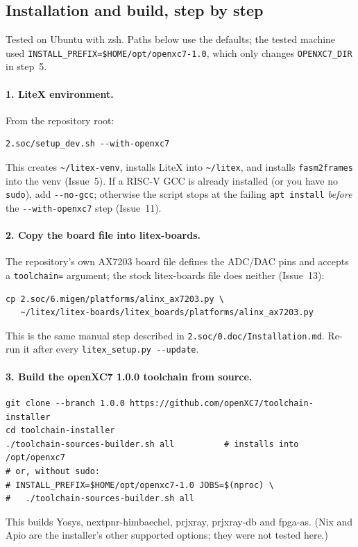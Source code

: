 \documentclass[11pt]{article}
\begin{document}
\subsection{Installation and build, step by step}
\label{sec:v100-install}

Tested on Ubuntu with zsh. Paths below use the defaults; the tested
machine used \lstinline{INSTALL_PREFIX=$HOME/opt/openxc7-1.0}, which only
changes \lstinline{OPENXC7_DIR} in step~5.

\paragraph{1. LiteX environment.} From the repository root:
\begin{lstlisting}[style=termout]
2.soc/setup_dev.sh --with-openxc7
\end{lstlisting}
This creates \lstinline{~/litex-venv}, installs LiteX into
\lstinline{~/litex}, and installs \lstinline{fasm2frames} into the venv
(Issue~5). If a RISC-V GCC is already installed (or you have no
\lstinline{sudo}), add \lstinline{--no-gcc}; otherwise the script stops at
the failing \lstinline{apt install} \emph{before} the
\lstinline{--with-openxc7} step (Issue~11).

\paragraph{2. Copy the board file into litex-boards.} The repository's own
AX7203 board file defines the ADC/DAC pins and accepts a
\lstinline{toolchain=} argument; the stock litex-boards file does neither
(Issue~13):
\begin{lstlisting}[style=termout]
cp 2.soc/6.migen/platforms/alinx_ax7203.py \
   ~/litex/litex-boards/litex_boards/platforms/alinx_ax7203.py
\end{lstlisting}
This is the same manual step described in
\lstinline{2.soc/0.doc/Installation.md}. Re-run it after every
\lstinline{litex_setup.py --update}.

\paragraph{3. Build the openXC7 1.0.0 toolchain from source.}
\begin{lstlisting}[style=termout]
git clone --branch 1.0.0 https://github.com/openXC7/toolchain-installer
cd toolchain-installer
./toolchain-sources-builder.sh all          # installs into /opt/openxc7
# or, without sudo:
# INSTALL_PREFIX=$HOME/opt/openxc7-1.0 JOBS=$(nproc) \
#   ./toolchain-sources-builder.sh all
\end{lstlisting}
This builds Yosys, nextpnr-himbaechel, prjxray, prjxray-db and fpga-as.
(Nix and Apio are the installer's other supported options; they were not
tested here.)
\end{document}
